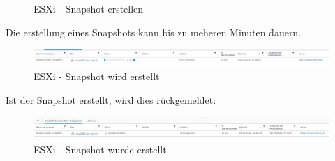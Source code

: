 {\begin{flushleft}
\begin{figure}[H]
            \caption{ESXi - Snapshot erstellen}
            \label{fig:esxi_set_snapshot}
        \end{figure}
    \end{flushleft}
    \begin{flushleft}
        Die erstellung eines Snapshots kann bis zu meheren Minuten dauern.
        \begin{figure}[H]
            \centering
            \includegraphics[width=1\linewidth]{source/snapshots/esxi_create_snapshote}
            \caption{ESXi - Snapshot wird erstellt}
            \label{fig:esxi_create_snapshote}
        \end{figure}
    \end{flushleft}
    \begin{flushleft}
        Ist der Snapshot erstellt, wird dies rückgemeldet:
        \begin{figure}[H]
            \centering
            \includegraphics[width=1\linewidth]{source/snapshots/esxi_snapshot_created}
            \caption{ESXi - Snapshot wurde erstellt}
            \label{fig:esxi_snapshot_created}
        \end{figure}
    \end{flushleft}
}
